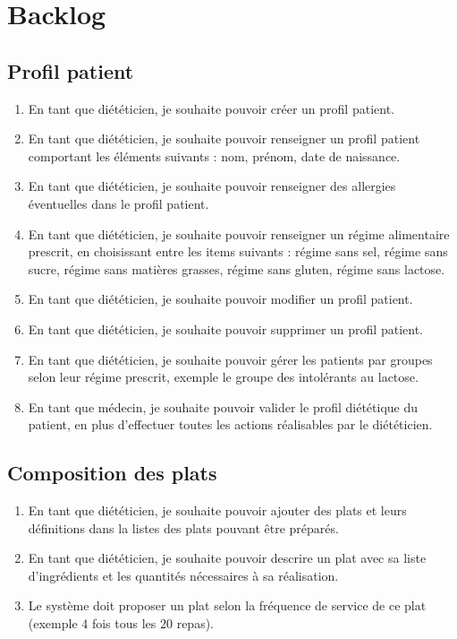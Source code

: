 \section{Backlog}
\subsection{Profil patient}
\begin{enumerate}
\item En tant que diététicien, je souhaite pouvoir créer un profil patient.
\item En tant que diététicien, je souhaite pouvoir renseigner un profil patient comportant les éléments suivants : nom, prénom, date de naissance.
\item En tant que diététicien, je souhaite pouvoir renseigner des allergies éventuelles dans le profil patient.
\item En tant que diététicien, je souhaite pouvoir renseigner un régime alimentaire prescrit, en choisissant entre les items suivants : régime sans sel, régime sans sucre, régime sans matières grasses, régime sans gluten, régime sans lactose.
\item En tant que diététicien, je souhaite pouvoir modifier un profil patient.
\item En tant que diététicien, je souhaite pouvoir supprimer un profil patient.
\item En tant que diététicien, je souhaite pouvoir gérer les patients par groupes selon leur régime prescrit, exemple le groupe des intolérants au lactose.
\item En tant que médecin, je souhaite pouvoir valider le profil diététique du patient, en plus d'effectuer toutes les actions réalisables par le diététicien.
\end{enumerate}

\subsection{Composition des plats}
\begin{enumerate}
\item En tant que diététicien, je souhaite pouvoir ajouter des plats et leurs définitions dans la listes des plats pouvant être préparés.
\item En tant que diététicien, je souhaite pouvoir descrire un plat avec sa liste d'ingrédients et les quantités nécessaires à sa réalisation.
\item Le système doit proposer un plat selon la fréquence de service de ce plat (exemple 4 fois tous les 20 repas).
  \end{enumerate}
